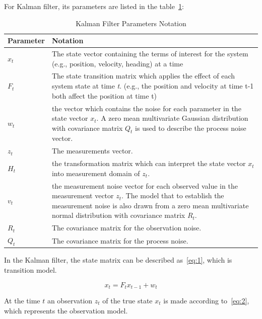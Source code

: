 \documentclass[11pt, a4paper]{article}
\begin{document}
For Kalman filter, its parameters are listed in the table~\ref{tab:kf_meaning}:

\begin{table}[htbp] 
	\begin{center}
		\caption{Kalman Filter Parameters Notation}
		\begin{tabular}{|l|p{400pt}|} \hline
			Parameter & Notation \\ \hline
			${x_t}$ & The state vector containing the terms of interest for the system (e.g., position, velocity, heading) at a time 
			\\ \hline
			${F_t}$ & The state transition matrix which applies the effect of each system state at time \textit{t}. (e.g., the position and velocity at time t-1 both affect the position at time t) \\ \hline
			${w_t}$ & the vector which contains the noise for each parameter in the state vector ${x_t}$. A zero mean multivariate Gaussian distribution with covariance matrix ${Q_t}$ is used to describe the process noise vector. \\ \hline
			${z_t}$ & The measurements vector. \\ \hline
			${H_t}$ & the transformation matrix which can interpret the state vector ${x_t}$ into measurement domain of ${z_t}$. \\ \hline
			${v_t}$ &  the measurement noise vector for each observed value in the measurement vector ${z_t}$. The model that to establish the measurement noise is also drawn from a zero mean multivariate normal distribution with covariance matrix ${R_t}$. \\ \hline
			${R_t}$ & The covariance matrix for the observation noise. \\ \hline
			${Q_t}$ & The covariance matrix for the process noise. \\ \hline
			
		\end{tabular}
		
		\label{tab:kf_meaning}
	\end{center}
\end{table}

In the Kalman filter, the state matrix can be described as~\ref{eq:1}, which is transition model.

\begin{equation}
x_{t} = F_{t}x_{t-1} + w_t 
\end{equation}\label{eq:1}

At the time $t$ an observation $z_t$ of the true state $x_t$ is made according to~\ref{eq:2}, which represents the observation model.
\end{document}
